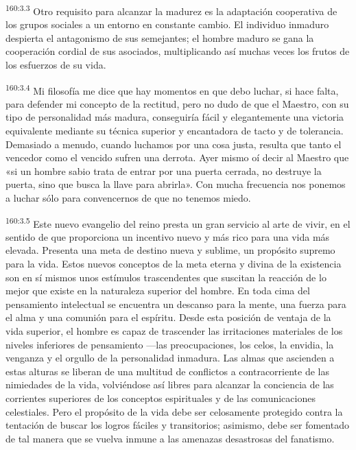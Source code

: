 \par 
\textsuperscript{160:3.3} Otro requisito para alcanzar la madurez es la adaptación cooperativa de los grupos sociales a un entorno en constante cambio. El individuo inmaduro despierta el antagonismo de sus semejantes; el hombre maduro se gana la cooperación cordial de sus asociados, multiplicando así muchas veces los frutos de los esfuerzos de su vida.

\par 
\textsuperscript{160:3.4} Mi filosofía me dice que hay momentos en que debo luchar, si hace falta, para defender mi concepto de la rectitud, pero no dudo de que el Maestro, con su tipo de personalidad más madura, conseguiría fácil y elegantemente una victoria equivalente mediante su técnica superior y encantadora de tacto y de tolerancia. Demasiado a menudo, cuando luchamos por una cosa justa, resulta que tanto el vencedor como el vencido sufren una derrota. Ayer mismo oí decir al Maestro que «si un hombre sabio trata de entrar por una puerta cerrada, no destruye la puerta, sino que busca la llave para abrirla». Con mucha frecuencia nos ponemos a luchar sólo para convencernos de que no tenemos miedo.

\par 
\textsuperscript{160:3.5} Este nuevo evangelio del reino presta un gran servicio al arte de vivir, en el sentido de que proporciona un incentivo nuevo y más rico para una vida más elevada. Presenta una meta de destino nueva y sublime, un propósito supremo para la vida. Estos nuevos conceptos de la meta eterna y divina de la existencia son en sí mismos unos estímulos trascendentes que suscitan la reacción de lo mejor que existe en la naturaleza superior del hombre. En toda cima del pensamiento intelectual se encuentra un descanso para la mente, una fuerza para el alma y una comunión para el espíritu. Desde esta posición de ventaja de la vida superior, el hombre es capaz de trascender las irritaciones materiales de los niveles inferiores de pensamiento ---las preocupaciones, los celos, la envidia, la venganza y el orgullo de la personalidad inmadura. Las almas que ascienden a estas alturas se liberan de una multitud de conflictos a contracorriente de las nimiedades de la vida, volviéndose así libres para alcanzar la conciencia de las corrientes superiores de los conceptos espirituales y de las comunicaciones celestiales. Pero el propósito de la vida debe ser celosamente protegido contra la tentación de buscar los logros fáciles y transitorios; asimismo, debe ser fomentado de tal manera que se vuelva inmune a las amenazas desastrosas del fanatismo.

